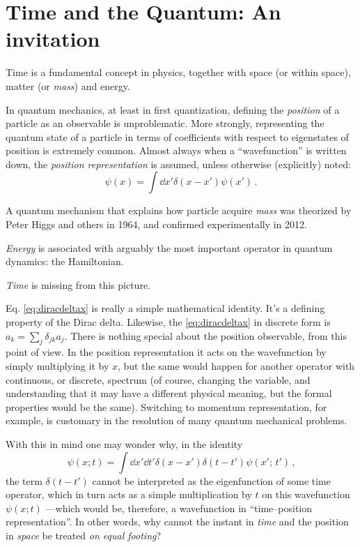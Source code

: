 \section{Time and the Quantum: An invitation}

Time is a fundamental concept in physics, together with space (or  within space),
matter (or \emph{mass}) and energy.

In quantum mechanics, at least in first quantization, defining the \emph{position} of a particle as
an observable is unproblematic. More strongly, representing the quantum state of a particle
in terms of coefficients with respect to eigenstates of position is extremely common.
Almost always when a ``wavefunction'' is written down, the \emph{position representation}
is assumed, unless otherwise (explicitly) noted:
\begin{equation}\label{eq:diracdeltax}
  \psi(x) = \int \dd{x'} \delta(x-x') \psi(x') \,\text{.}
\end{equation}

A quantum mechanism that explains how particle acquire \emph{mass} was theorized by
Peter Higgs and others in 1964, and confirmed experimentally in 2012.

\emph{Energy} is associated with arguably the most important operator in quantum dynamics: the Hamiltonian.

\emph{Time} is missing from this picture.

Eq. \eqref{eq:diracdeltax} is really a simple mathematical identity.
It's a defining property of the Dirac delta.
Likewise, the \eqref{eq:diracdeltax} in discrete form is $a_k = \sum_j \delta_{jk} a_j$.
There is nothing special about the position observable, from this point of view.
In the position representation it acts on the wavefunction by simply
multiplying it by $x$,
but the same would happen for another operator with continuous, or discrete, spectrum
(of course, changing the variable, and understanding that it may have a different physical meaning,
but the formal properties would be the same).
Switching to momentum representation, for example, is customary in the resolution of many quantum mechanical problems.

With this in mind one may wonder why, in the identity
\begin{equation}\label{eq:diracdeltaxt}
  \psi(x; t) = \int \dd{x'}\dd{t'} \delta(x-x')\delta(t-t') \psi(x';\, t') \,\text{,}
\end{equation}
the term $\delta(t-t')$ cannot be interpreted as the eigenfunction of some time operator,
which in turn acts as a simple multiplication by $t$ on this
wavefunction $\psi(x; t)$ ---which would be, therefore, a wavefunction in ``time--position representation''.
In other words, why cannot the instant in \emph{time} and the position in \emph{space} be treated
\emph{on equal footing}?

